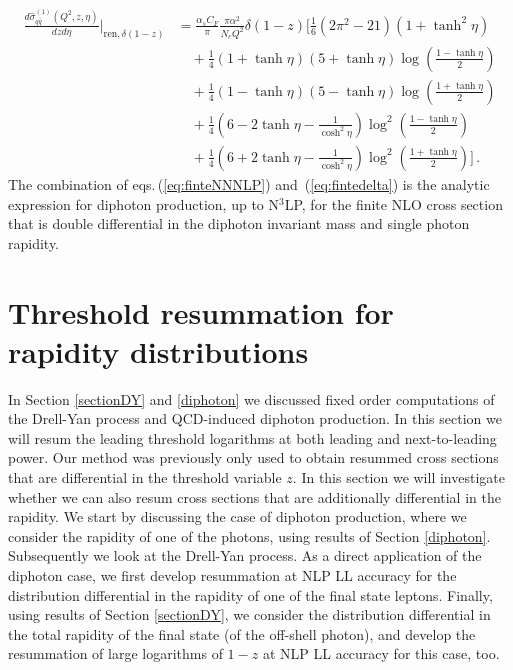 \documentclass[11pt]{article}
\newcommand\eqns[2]    {eqs.\,(\ref{#1}) and~(\ref{#2})}
\begin{document}
%
\begin{align}\label{eq:fintedelta}
    \frac{d\hat{\sigma}_{q\bar{q}}^{(1)}(Q^2,z,\eta)}{dzd\eta}\bigg|_{\text{ren},\delta(1-z)} &= \frac{\alpha_sC_F}{\pi}\frac{\pi\alpha^2}{N_c Q^2} \delta(1-z)\bigg[\frac{1}{6}\left(2\pi^2-21\right)\left(1+\tanh^2\eta\right) \nonumber \\ 
    &\quad+\frac{1}{4}\left(1+\tanh\eta\right)\left(5+\tanh\eta\right)\log\left(\frac{1-\tanh\eta}{2}\right)\nonumber \\ 
    &\quad+\frac{1}{4}\left(1-\tanh\eta\right)\left(5-\tanh\eta\right)\log\left(\frac{1+\tanh\eta}{2}\right) \nonumber \\ 
    &\quad+\frac{1}{4}\left(6-2\tanh\eta-\frac{1}{\cosh^2\eta}\right)\log^2\left(\frac{1-\tanh\eta}{2}\right)\nonumber \\ 
    &\quad+\frac{1}{4}\left(6+2\tanh\eta-\frac{1}{\cosh^2\eta}\right)\log^2\left(\frac{1+\tanh\eta}{2}\right)\bigg]\,.
\end{align}
%
The combination of  \eqns{eq:finteNNNLP}{eq:fintedelta} is the analytic expression for diphoton production, up to N$^3$LP, for the finite NLO cross section that is double differential in the diphoton invariant mass and single photon rapidity.


\section{Threshold resummation for rapidity distributions}
\label{resum}

In Section \ref{sectionDY} and \ref{diphoton} we discussed fixed order computations of the Drell-Yan process and QCD-induced diphoton production. In this section we will resum the leading threshold logarithms at both leading and next-to-leading power. Our method was previously only used to obtain resummed cross sections that are differential in the threshold variable $z$. In this section we will investigate whether we can also resum cross sections that are additionally differential in the rapidity. We start by discussing the case of diphoton production, where we consider the rapidity of one of the photons, using results of Section \ref{diphoton}. Subsequently we look at the Drell-Yan process. As a direct application of the diphoton case, we first develop resummation at NLP LL accuracy for the distribution differential in the rapidity of one of the final state leptons. Finally, using results of Section \ref{sectionDY}, we 
consider the distribution differential in the total rapidity of the final state (of the off-shell photon), and develop the resummation of large logarithms of $1-z$ at NLP LL accuracy for this case, too.
\end{document}
